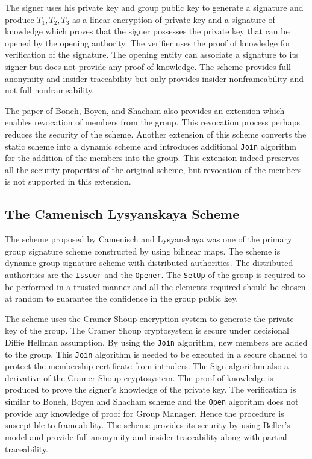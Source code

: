 The signer uses his private key and group public key to generate a signature and produce $T_1, T_2, T_3$ as a linear encryption of private key and a signature of knowledge which proves that the signer possesses the private key that can be opened by the opening authority. The verifier uses the proof of knowledge for verification of the signature. The opening entity can associate a signature to its signer but does not provide any proof of knowledge. The scheme provides full anonymity and insider traceability but only provides insider nonframeability and not full nonframeability. 

The paper of Boneh, Boyen, and Shacham also provides an extension which enables revocation of members from the group. This revocation process perhaps reduces the security of the scheme. Another extension of this scheme converts the static scheme into a dynamic scheme and introduces additional \texttt{Join} algorithm for the addition of the members into the group. This extension indeed preserves all the security properties of the original scheme, but revocation of the members is not supported in this extension.

\subsection{The Camenisch Lysyanskaya Scheme}\label{CL}
The scheme proposed by Camenisch and Lysyanskaya was one of the primary group signature scheme constructed by using bilinear maps\cite{camenisch2004signature}. The scheme is dynamic group signature scheme with distributed authorities. The distributed authorities are the \texttt{Issuer} and the \texttt{Opener}. The \texttt{SetUp} of the group is required to be performed in a trusted manner and all the elements required should be chosen at random to guarantee the confidence in the group public key. 

The scheme uses the Cramer Shoup encryption system to generate the private key of the group\cite{cramer1998practical}. The Cramer Shoup cryptosystem is secure under decisional Diffie Hellman assumption. By using the \texttt{Join} algorithm, new members are added to the group. This \texttt{Join} algorithm is needed to be executed in a secure channel to protect the membership certificate from intruders. The Sign algorithm also a derivative of the Cramer Shoup cryptosystem. The proof of knowledge is produced to prove the signer’s knowledge of the private key. The verification is similar to Boneh, Boyen and Shacham scheme and the \texttt{Open} algorithm does not provide any knowledge of proof for Group Manager. Hence the procedure is susceptible to frameability. The scheme provides its security by using Beller’s model and provide full anonymity and insider traceability along with partial traceability. 

